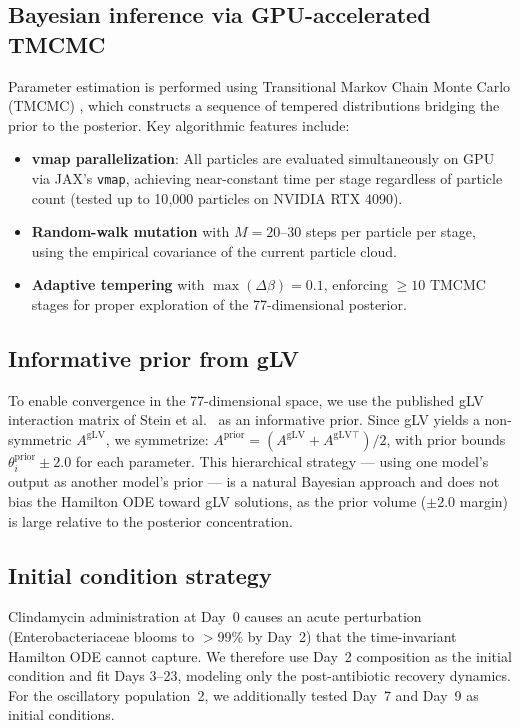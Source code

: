 \documentclass[10pt,a4paper]{article}
\begin{document}
\subsection{Bayesian inference via GPU-accelerated TMCMC}

Parameter estimation is performed using Transitional Markov Chain Monte
Carlo (TMCMC) \cite{ching2007}, which constructs a sequence of tempered
distributions bridging the prior to the posterior. Key algorithmic features
include:

\begin{itemize}
\item \textbf{vmap parallelization}: All particles are evaluated
simultaneously on GPU via JAX's \texttt{vmap}, achieving near-constant
time per stage regardless of particle count (tested up to 10{,}000
particles on NVIDIA RTX 4090).
\item \textbf{Random-walk mutation} with $M = 20$--$30$ steps per
particle per stage, using the empirical covariance of the current
particle cloud.
\item \textbf{Adaptive tempering} with $\max(\Delta\beta) = 0.1$,
enforcing $\geq 10$ TMCMC stages for proper exploration of the
77-dimensional posterior.
\end{itemize}

\subsection{Informative prior from gLV}

To enable convergence in the 77-dimensional space, we use the published
gLV interaction matrix of Stein et al.\ \cite{stein2013} as an informative
prior. Since gLV yields a non-symmetric $A^{\mathrm{gLV}}$, we symmetrize:
$A^{\mathrm{prior}} = (A^{\mathrm{gLV}} + A^{\mathrm{gLV}\top})/2$,
with prior bounds $\theta_i^{\mathrm{prior}} \pm 2.0$ for each parameter.
This hierarchical strategy --- using one model's output as another model's
prior --- is a natural Bayesian approach and does not bias the Hamilton ODE
toward gLV solutions, as the prior volume ($\pm 2.0$ margin) is large
relative to the posterior concentration.

\subsection{Initial condition strategy}

Clindamycin administration at Day~0 causes an acute perturbation
(Enterobacteriaceae blooms to $>$99\% by Day~2) that the time-invariant
Hamilton ODE cannot capture. We therefore use Day~2 composition as the
initial condition and fit Days 3--23, modeling only the post-antibiotic
recovery dynamics. For the oscillatory population~2, we additionally
tested Day~7 and Day~9 as initial conditions.
\end{document}
